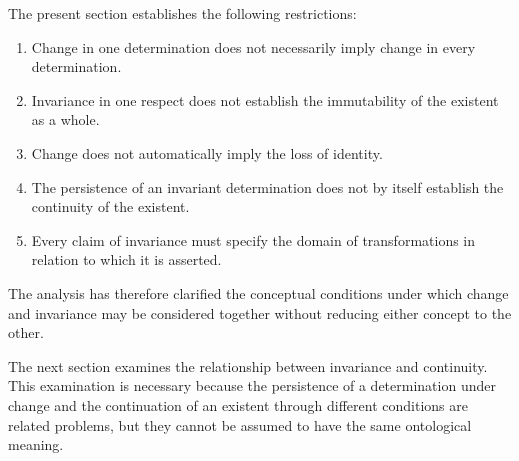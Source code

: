 The present section establishes
the following restrictions:

\begin{enumerate}
    \item Change in one determination
    does not necessarily imply
    change in every determination.

    \item Invariance in one respect
    does not establish the immutability
    of the existent as a whole.

    \item Change does not automatically
    imply the loss of identity.

    \item The persistence of an invariant
    determination does not by itself
    establish the continuity of the
    existent.

    \item Every claim of invariance
    must specify the domain of
    transformations in relation
    to which it is asserted.
\end{enumerate}

The analysis has therefore clarified
the conceptual conditions under
which change and invariance may
be considered together without
reducing either concept to the other.

The next section examines the
relationship between invariance
and continuity. This examination
is necessary because the persistence
of a determination under change
and the continuation of an existent
through different conditions are
related problems, but they cannot
be assumed to have the same
ontological meaning.

